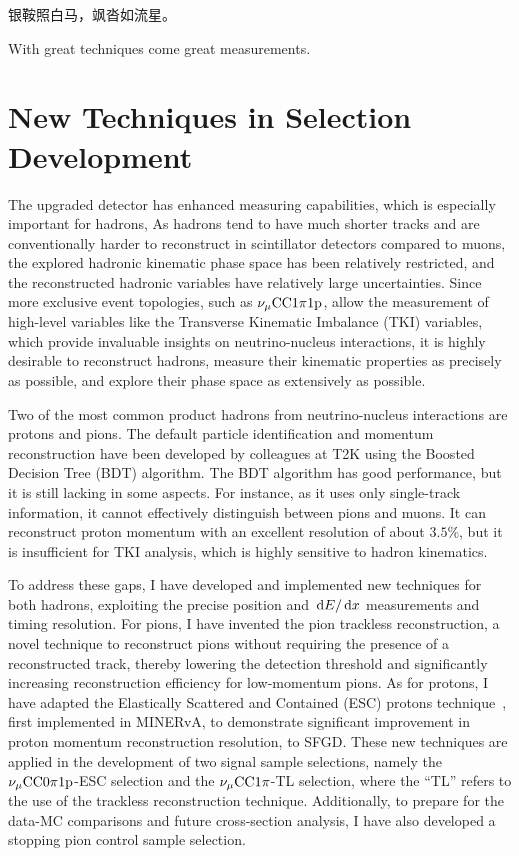 \begin{savequote}[8cm]
\begin{CJK*}{UTF8}{gbsn}
  银鞍照白马，飒沓如流星。
\end{CJK*}

With great techniques come great measurements.

\end{savequote}

\chapter{\label{ch:techniques}New Techniques in Selection Development} 
\minitoc

The upgraded detector has enhanced measuring capabilities, which is especially important for hadrons,
As hadrons tend to have much shorter tracks and are conventionally harder to reconstruct in scintillator detectors compared to muons, the explored hadronic kinematic phase space has been relatively restricted, and the reconstructed hadronic variables have relatively large uncertainties.
Since more exclusive event topologies, such as $\nu_{\mu}\textrm{CC}1\pi1\textrm{p}$, allow the measurement of high-level variables like the Transverse Kinematic Imbalance (TKI) variables, which provide invaluable insights on neutrino-nucleus interactions, it is highly desirable to reconstruct hadrons, measure their kinematic properties as precisely as possible, and explore their phase space as extensively as possible.

Two of the most common product hadrons from neutrino-nucleus interactions are protons and pions. 
The default particle identification and momentum reconstruction have been developed by colleagues at T2K using the Boosted Decision Tree (BDT) algorithm. The BDT algorithm has good performance, but it is still lacking in some aspects.
For instance, as it uses only single-track information, it cannot effectively distinguish between pions and muons. 
It can reconstruct proton momentum with an excellent resolution of about $3.5\%$, but it is insufficient for TKI analysis, which is highly sensitive to hadron kinematics. 

To address these gaps, I have developed and implemented new techniques for both hadrons, exploiting the precise position and $\,\textrm{d}E/\,\textrm{d}x$ measurements and timing resolution.
For pions, I have invented the pion trackless reconstruction, a novel technique to reconstruct pions without requiring the presence of a reconstructed track, thereby lowering the detection threshold and significantly increasing reconstruction efficiency for low-momentum pions. 
As for protons, I have adapted the Elastically Scattered and Contained (ESC) protons technique~\cite{Lu:2016mjf}, first implemented in MINERvA, to demonstrate significant improvement in proton momentum reconstruction resolution, to SFGD. 
These new techniques are applied in the development of two signal sample selections, namely the $\nu_{\mu}\textrm{CC}0\pi1\textrm{p}$-ESC selection and the $\nu_{\mu}\textrm{CC}1\pi$-TL selection, where the ``TL'' refers to the use of the trackless reconstruction technique.
Additionally, to prepare for the data-MC comparisons and future cross-section analysis, I have also developed a stopping pion control sample selection.

